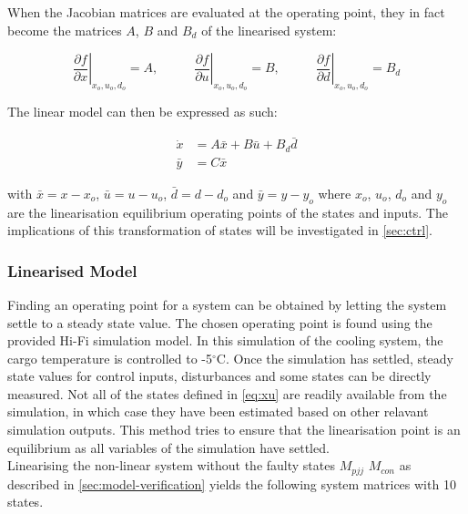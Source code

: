 When the Jacobian matrices are evaluated at the operating point, they in fact become the matrices $ A $, $ B $ and $ B_d  $ of the linearised system:

\begin{equation}
	\left. \dfrac{\partial f}{\partial x} \right |_{x_o, u_o, d_o} = A, \;\;\;\;\;\;\;\;\;\;
	\left. \dfrac{\partial f}{\partial u} \right |_{x_o, u_o, d_o} = B, \;\;\;\;\;\;\;\;\;\;
	\left. \dfrac{\partial f}{\partial d} \right |_{x_o, u_o, d_o} = B_d
\end{equation}

The linear model can then be expressed as such:

\begin{equation} \label{eq:state_space_linear}
	\begin{split}
		\dot{x} & = A\bar{x} + B\bar{u} + B_d\bar{d} \\
		\bar{y} & = C\bar{x}
	\end{split}
\end{equation}

with $\bar{x} = x-x_o$, $\bar{u} = u-u_o$, $\bar{d} = d-d_o$ and $\bar{y} = y-y_o$ where $x_o$, $u_o$, $d_o$ and $y_o$ are the linearisation equilibrium operating points of the states and inputs. The implications of this transformation of states will be investigated in \cref{sec:ctrl}.

\subsubsection{Linearised Model}
Finding an operating point for a system can be obtained by letting the system settle to a steady state value. The chosen operating point is found using the provided Hi-Fi simulation model. In this simulation of the cooling system, the cargo temperature is controlled to -5$^{\circ}$C. Once the simulation has settled, steady state values for control inputs, disturbances and some states can be directly measured. Not all of the states defined in \cref{eq:xu} are readily available from the simulation, in which case they have been estimated based on other relavant simulation outputs. This method tries to ensure that the linearisation point is an equilibrium as all variables of the simulation have settled.\\

Linearising the non-linear system without the faulty states $ M_{pjj} $ $ M_{con} $ as described in \cref{sec:model-verification} yields the following system matrices with 10 states.

